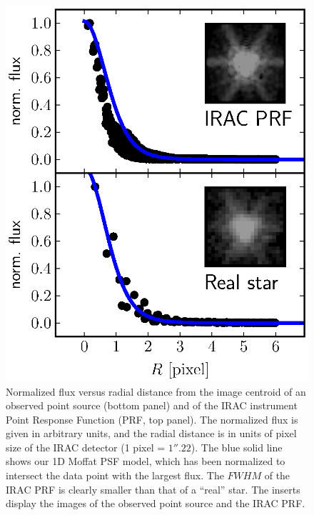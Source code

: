 \documentclass[preprint2]{emulateapj}
\begin{document}
\begin{figure}[h]
\begin{center}
\includegraphics[width=1\columnwidth, trim = 240 40 50 20, clip=True]{psf.eps}
\caption{Normalized flux versus radial distance 
from the image centroid of an observed point source (bottom panel) 
and of the IRAC instrument Point Response Function (PRF, top panel). 
The normalized flux is given in arbitrary units, 
and the radial distance is in units of pixel size of the IRAC detector (1 pixel = $1''.22$).
The blue solid line shows our 1D Moffat PSF model,
which has been normalized to intersect the data point with the largest flux. 
The $FWHM$ of the IRAC PRF is clearly smaller than that of a ``real'' star.
The inserts display the images of the observed point source and the IRAC PRF.}
\label{fig:psf}
\end{center}
\end{figure}
\end{document}
